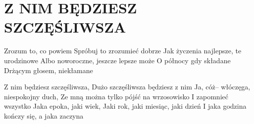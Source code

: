 \documentclass[../../../songbook.tex]{subfiles}
\begin{document}
\TabPositions{8cm} %
\section*{Z NIM BĘDZIESZ SZCZĘŚLIWSZA}
{}
\vspace{0.5cm}
Zrozum to, co powiem					 \newline	
Spróbuj to zrozumieć dobrze				 \newline	
Jak życzenia najlepsze, te urodzinowe	 \newline	
Albo noworoczne, jeszcze lepsze może	 \newline	
O północy gdy składane					 \newline	
Drżącym głosem, niekłamane				 \newline	

\-\hspace{1cm} Z nim będziesz szczęśliwsza,					 \newline	
\-\hspace{1cm} Dużo szczęśliwsza będziesz z nim				 \newline	
\-\hspace{1cm} Ja, cóż– włóczęga, niespokojny duch,			 \newline	
\-\hspace{1cm} Ze mną można tylko pójść na wrzosowisko		 \newline	
\-\hspace{1cm} I zapomnieć wszystko							 \newline	
\-\hspace{1cm} Jaka epoka, jaki wiek,						 \newline	
\-\hspace{1cm} Jaki rok, jaki miesiąc, jaki dzień			 \newline	
\-\hspace{1cm} I jaka godzina kończy się, a jaka zaczyna	 \newline	
\end{document}
